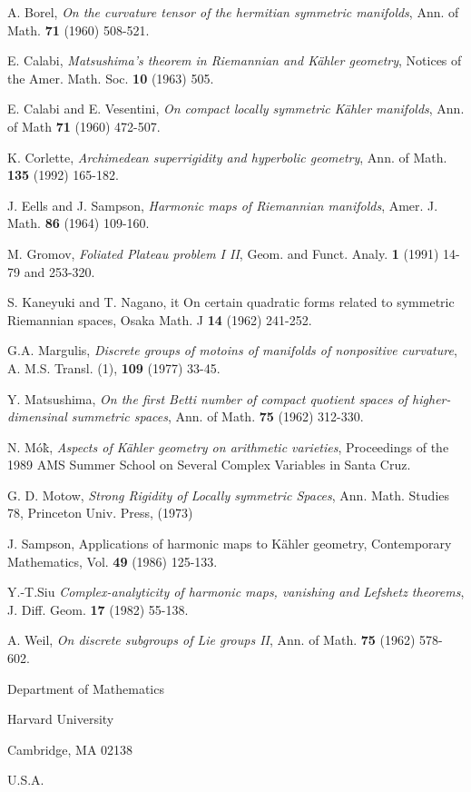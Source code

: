 \begin{thebibliography}{99}
 A. Borel, \textit{On the curvature tensor of the hermitian symmetric manifolds}, Ann. of Math.
{\bf 71} (1960) 508-521.

 E. Calabi, \textit{Matsushima's theorem in Riemannian and K\"ahler geometry}, Notices of the Amer. Math. Soc. {\bf 10} (1963) 505.

 E. Calabi and E. Vesentini, \textit{On compact locally symmetric K\"ahler manifolds}, Ann. of Math {\bf 71} (1960) 472-507.

 K. Corlette, \textit{Archimedean superrigidity and hyperbolic geometry}, Ann. of Math. {\bf 135} (1992) 165-182.

 J. Eells and J. Sampson, \textit{Harmonic maps of Riemannian manifolds}, Amer. J. Math. {\bf 86} (1964) 109-160.

M. Gromov, \textit{Foliated Plateau problem I II}, Geom. and Funct. Analy. {\bf 1} (1991) 14-79 and 253-320.

 S. Kaneyuki and T. Nagano, it On certain quadratic forms related to symmetric Riemannian spaces, Osaka Math. J {\bf 14} (1962) 241-252.

G.A. Margulis, \textit{Discrete groups of motoins of manifolds of nonpositive curvature}, A. M.S. Transl. (1), {\bf 109} (1977) 33-45.

 Y. Matsushima, \textit{On the first Betti number of compact quotient spaces of higher-dimensinal summetric spaces}, Ann. of Math. {\bf 75} (1962) 312-330.

N. M\'o\`k, \textit{Aspects of K\"ahler geometry on arithmetic varieties}, Proceedings of the 1989 AMS Summer School on Several Complex Variables in Santa Cruz.

 G. D. Motow, \textit{Strong Rigidity of Locally symmetric Spaces}, Ann. Math. Studies 78, Princeton Univ. Press, (1973)

 J. Sampson, Applications of harmonic maps to K\"ahler geometry, Contemporary Mathematics,
Vol. {\bf 49} (1986) 125-133.

Y.-T.Siu \textit{Complex-analyticity of harmonic maps, vanishing and Lefshetz theorems}, J. Diff. Geom. {\bf 17} (1982) 55-138.

A. Weil, \textit{On discrete subgroups of Lie groups II}, Ann. of Math. {\bf 75} (1962) 578-602.
\end{thebibliography}

\begin{flushleft}
Department of Mathematics

Harvard University

Cambridge, MA 02138

U.S.A.
\end{flushleft}
